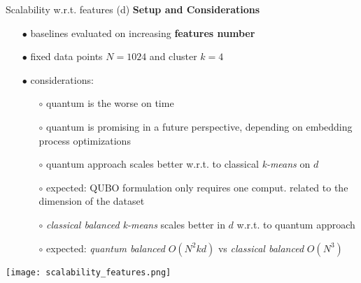 		\begin{frame}[allowframebreaks]{Scalability w.r.t. features (d)}
			\textbf{Setup and Considerations}
			\begin{itemize}
				\item[$\bullet$] baselines evaluated on increasing \textbf{features number}
				\item[$\bullet$] fixed data points $N=1024$ and cluster $k=4$ 
				\item[$\bullet$] considerations:
				\begin{itemize}
					\item[$\circ$] quantum is the worse on time 
					\item[$\circ$] quantum is promising in a future perspective, depending on embedding process optimizations
					\item[$\circ$] quantum approach scales better w.r.t. to classical \textit{k-means} on $d$  
					\item[$\circ$] expected: QUBO formulation only requires one comput. related to the dimension of the dataset %
					\item[$\circ$] \textit{classical balanced k-means} scales better in $d$ w.r.t. to quantum approach 
					\item[$\circ$] expected: \textit{quantum balanced} $O(N^2kd)$ vs \textit{classical balanced} $O(N^3)$  
				\end{itemize} 
			\end{itemize}
			\begin{center}
				\texttt{[image: scalability\_features.png]}
			\end{center}
		\end{frame}
	
